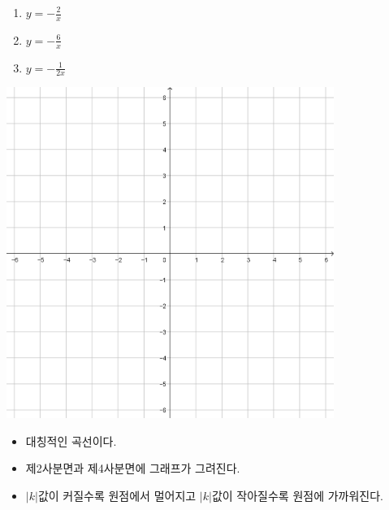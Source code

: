 \documentclass{oblivoir}
\begin{document}
\newpage
%
\begin{enumerate}\label{rational5}
\item
\(y=-\frac2x\)
\item
\(y=-\frac6x\)
\item
\(y=-\frac1{2x}\)
\end{enumerate}
\begin{center}
\includegraphics[width=0.8\textwidth]{66grid}
\end{center}

\begin{mdframed}
%
\begin{itemize}\label{rational6}
\item
대칭적인 곡선이다.
\item
제2사분면과 제4사분면에 그래프가 그려진다.
\item
\(|k|\)값이 커질수록 원점에서 멀어지고 \(|k|\)값이 작아질수록 원점에 가까워진다.
\end{itemize}
\end{mdframed}

%
\label{rational7}
\end{document}
